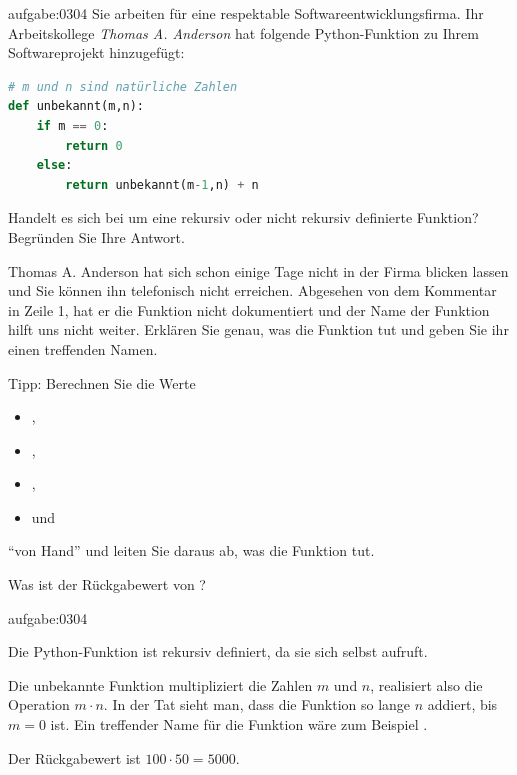 \begin{aufgabe}{aufgabe:0304}
Sie arbeiten für eine respektable Softwareentwicklungsfirma. Ihr Arbeitskollege \textit{Thomas A. Anderson} hat folgende Python-Funktion zu Ihrem Softwareprojekt hinzugefügt:
\begin{lstlisting}[language=Python]
# m und n sind natürliche Zahlen
def unbekannt(m,n):
    if m == 0:
        return 0
    else:
        return unbekannt(m-1,n) + n
\end{lstlisting}
\begin{aenum}
    \item Handelt es sich bei  um eine rekursiv oder nicht rekursiv definierte Funktion? Begründen Sie Ihre Antwort.
    \item Thomas A. Anderson hat sich schon einige Tage nicht in der Firma blicken lassen und Sie können ihn telefonisch nicht erreichen. Abgesehen von dem Kommentar in Zeile 1, hat er die Funktion  nicht dokumentiert und der Name der Funktion hilft uns nicht weiter. Erklären Sie genau, was die Funktion tut und geben Sie ihr einen treffenden Namen.
    
    \noindent
    Tipp: Berechnen Sie die Werte
    \begin{itemize}
        \item {},
        \item {},
        \item {},
        \item und 
    \end{itemize}
    \enquote{von Hand} und leiten Sie daraus ab, was die Funktion tut.
    \item Was ist der Rückgabewert von ?
\end{aenum}
\end{aufgabe}
\begin{antwort}{aufgabe:0304}
\begin{aenum}
    \item Die Python-Funktion ist rekursiv definiert, da sie sich selbst aufruft.
    \item Die unbekannte Funktion multipliziert die Zahlen $m$ und $n$, realisiert also die Operation $m\cdot n$. In der Tat sieht man, dass die Funktion so lange $n$ addiert, bis $m = 0$ ist. Ein treffender Name für die Funktion wäre zum Beispiel .
    \item Der Rückgabewert ist $100\cdot 50 = 5000$.
\end{aenum}
\end{antwort}

